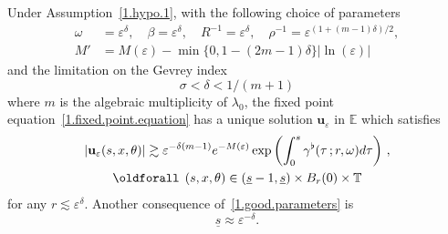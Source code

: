 \documentclass[AHL,Unicode,longabstracts,published]{cedram}
\theoremstyle{plain}
\newcommand*\e{\varepsilon}
\newcommand*\EE{{\mathbb E}}
\newcommand*\g{\gamma}
\newcommand{\ubf}{{\mathbf u}}
\newcommand*\und{\underline}
\renewcommand*{\forall}{\mathrel{\oldforall}}
\begin{document}
\begin{prop}\label{1.prop.below}
Under Assumption~\ref{1.hypo.1}, with the following choice of parameters
\begin{equation}\label{1.good.parameters}
\begin{aligned}
\omega &= \e^{\delta}, \quad \beta = \e^{\delta}, \quad R^{-1} = \e^{\delta}, \quad \rho^{-1} = \e^{(1 + (m-1)\delta)/2},\\
M' &= M(\e) - \min\{ 0, 1 - (2m-1)\delta \}|\ln(\e)|
\end{aligned}
\end{equation}
and the limitation on the Gevrey index
\[
\sigma < \delta <1/(m+1)
\]
where $m$ is the algebraic multiplicity of $\lambda_0$, the fixed point equation~\eqref{1.fixed.point.equation} has a unique solution $\ubf_{\e}$ in $\EE$ which satisfies
\begin{multline}
|\ubf_{\e}(s,x,\theta)| \gtrsim \e^{-\delta(m-1)} e^{-M(\e)} \exp \left(\int_{0}^{s} \g^{\flat}(\tau\,; r, \omega) d\tau \right) \,,\\
\forall\,(s,x,\theta)\in(\und{s} - 1, \und{s}) \times B_r(0)\times\mathbb{T}
\end{multline}
for any $r \lesssim \e^{\delta}$. Another consequence of~\eqref{1.good.parameters} is
\begin{equation}\label{1.final.und.s}
\und{s} \approx \e^{-\delta}.
\end{equation}
\end{prop}
\end{document}
